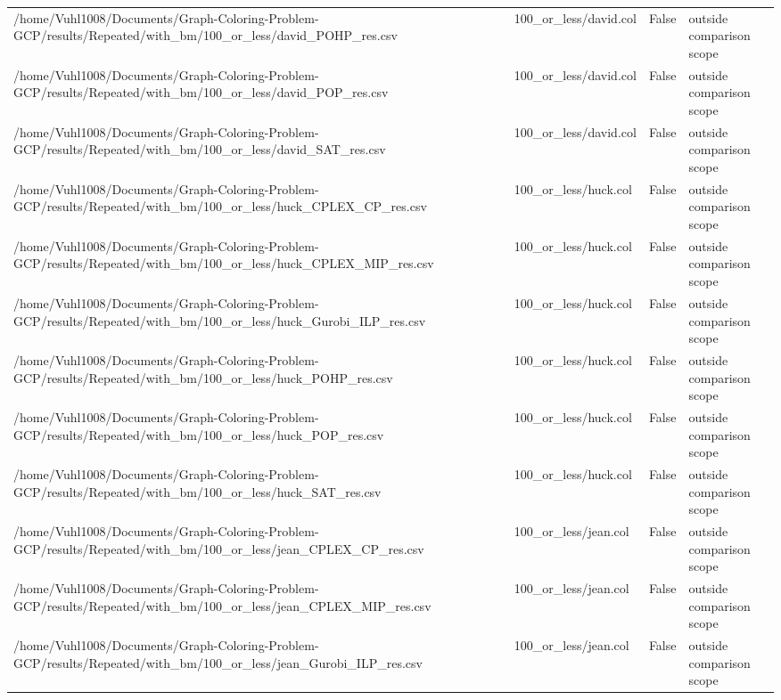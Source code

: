 \begin{table}[htbp]
\begin{tabular}{llll}
/home/Vuhl1008/Documents/Graph-Coloring-Problem-GCP/results/Repeated/with\_bm/100\_or\_less/david\_POHP\_res.csv & 100\_or\_less/david.col & False & outside comparison scope \\
/home/Vuhl1008/Documents/Graph-Coloring-Problem-GCP/results/Repeated/with\_bm/100\_or\_less/david\_POP\_res.csv & 100\_or\_less/david.col & False & outside comparison scope \\
/home/Vuhl1008/Documents/Graph-Coloring-Problem-GCP/results/Repeated/with\_bm/100\_or\_less/david\_SAT\_res.csv & 100\_or\_less/david.col & False & outside comparison scope \\
/home/Vuhl1008/Documents/Graph-Coloring-Problem-GCP/results/Repeated/with\_bm/100\_or\_less/huck\_CPLEX\_CP\_res.csv & 100\_or\_less/huck.col & False & outside comparison scope \\
/home/Vuhl1008/Documents/Graph-Coloring-Problem-GCP/results/Repeated/with\_bm/100\_or\_less/huck\_CPLEX\_MIP\_res.csv & 100\_or\_less/huck.col & False & outside comparison scope \\
/home/Vuhl1008/Documents/Graph-Coloring-Problem-GCP/results/Repeated/with\_bm/100\_or\_less/huck\_Gurobi\_ILP\_res.csv & 100\_or\_less/huck.col & False & outside comparison scope \\
/home/Vuhl1008/Documents/Graph-Coloring-Problem-GCP/results/Repeated/with\_bm/100\_or\_less/huck\_POHP\_res.csv & 100\_or\_less/huck.col & False & outside comparison scope \\
/home/Vuhl1008/Documents/Graph-Coloring-Problem-GCP/results/Repeated/with\_bm/100\_or\_less/huck\_POP\_res.csv & 100\_or\_less/huck.col & False & outside comparison scope \\
/home/Vuhl1008/Documents/Graph-Coloring-Problem-GCP/results/Repeated/with\_bm/100\_or\_less/huck\_SAT\_res.csv & 100\_or\_less/huck.col & False & outside comparison scope \\
/home/Vuhl1008/Documents/Graph-Coloring-Problem-GCP/results/Repeated/with\_bm/100\_or\_less/jean\_CPLEX\_CP\_res.csv & 100\_or\_less/jean.col & False & outside comparison scope \\
/home/Vuhl1008/Documents/Graph-Coloring-Problem-GCP/results/Repeated/with\_bm/100\_or\_less/jean\_CPLEX\_MIP\_res.csv & 100\_or\_less/jean.col & False & outside comparison scope \\
/home/Vuhl1008/Documents/Graph-Coloring-Problem-GCP/results/Repeated/with\_bm/100\_or\_less/jean\_Gurobi\_ILP\_res.csv & 100\_or\_less/jean.col & False & outside comparison scope \\

\end{tabular}
\end{table}
